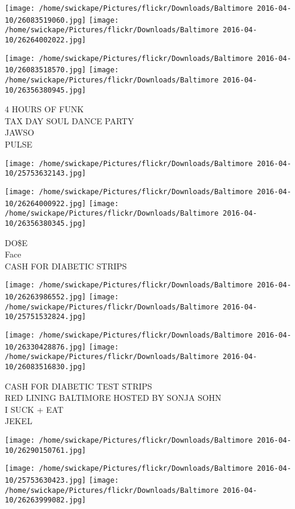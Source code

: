 \documentclass[10pt,letterpaper]{article}
\begin{document}
\texttt{[image: /home/swickape/Pictures/flickr/Downloads/Baltimore 2016-04-10/26083519060.jpg]}
\texttt{[image: /home/swickape/Pictures/flickr/Downloads/Baltimore 2016-04-10/26264002022.jpg]}

\texttt{[image: /home/swickape/Pictures/flickr/Downloads/Baltimore 2016-04-10/26083518570.jpg]}
\texttt{[image: /home/swickape/Pictures/flickr/Downloads/Baltimore 2016-04-10/26356380945.jpg]}

4 HOURS OF FUNK\\
TAX DAY SOUL DANCE PARTY\\
JAWSO\\
PULSE\\
\pagebreak

\texttt{[image: /home/swickape/Pictures/flickr/Downloads/Baltimore 2016-04-10/25753632143.jpg]}

\vspace{0.25in}
\texttt{[image: /home/swickape/Pictures/flickr/Downloads/Baltimore 2016-04-10/26264000922.jpg]}
\texttt{[image: /home/swickape/Pictures/flickr/Downloads/Baltimore 2016-04-10/26356380345.jpg]}

DO\$E\\
Face\\
CASH FOR DIABETIC STRIPS\\
\pagebreak

\texttt{[image: /home/swickape/Pictures/flickr/Downloads/Baltimore 2016-04-10/26263986552.jpg]}
\texttt{[image: /home/swickape/Pictures/flickr/Downloads/Baltimore 2016-04-10/25751532824.jpg]}

\texttt{[image: /home/swickape/Pictures/flickr/Downloads/Baltimore 2016-04-10/26330428876.jpg]}
\texttt{[image: /home/swickape/Pictures/flickr/Downloads/Baltimore 2016-04-10/26083516830.jpg]}

CASH FOR DIABETIC TEST STRIPS\\
RED LINING BALTIMORE HOSTED BY SONJA SOHN\\
I SUCK + EAT\\
JEKEL\\
\pagebreak

\texttt{[image: /home/swickape/Pictures/flickr/Downloads/Baltimore 2016-04-10/26290150761.jpg]}

\vspace{0.25in}
\texttt{[image: /home/swickape/Pictures/flickr/Downloads/Baltimore 2016-04-10/25753630423.jpg]}
\texttt{[image: /home/swickape/Pictures/flickr/Downloads/Baltimore 2016-04-10/26263999082.jpg]}
\end{document}
